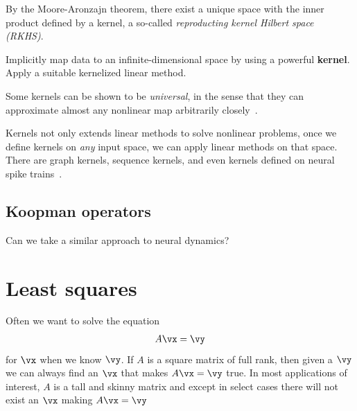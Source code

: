 \documentclass[a4paper,11pt]{exam}
\newcounter{ct}
\begin{document}
\begin{questions}
By the Moore-Aronzajn theorem\citep{Aronszajn1950}, there exist a unique space with the inner product defined by a kernel, a so-called \emph{reproducting kernel Hilbert space (RKHS)}.

\begin{tcolorbox}[colback=black!1!,title=Kernel Trick!]
Implicitly map data to an infinite-dimensional space by using a powerful \textbf{kernel}.
Apply a suitable kernelized linear method.
\end{tcolorbox}

Some kernels can be shown to be \emph{universal}, in the sense that they can approximate almost any nonlinear map arbitrarily closely~\citep{Scholkopf2002}.

Kernels not only extends linear methods to solve nonlinear problems, once we define kernels on \emph{any} input space, we can apply linear methods on that space.
There are graph kernels, sequence kernels, and even kernels defined on neural spike trains~\citep{Park2012a,Park2013a}.

\subsection{Koopman operators}
Can we take a similar approach to neural dynamics?

\end{questions}

\newpage
\section{Least squares}
Often we want to solve the equation
\begin{align}
    A \vx = \vy
\end{align}
for $\vx$ when we know $\vy$.  If $A$ is a square matrix of full rank, then given a $\vy$ we can always find an $\vx$ that makes $A\vx = \vy$ true.  In most applications of interest, $A$ is a tall and skinny matrix and except in select cases there will not exist an $\vx$ making $A\vx = \vy$
\end{document}
